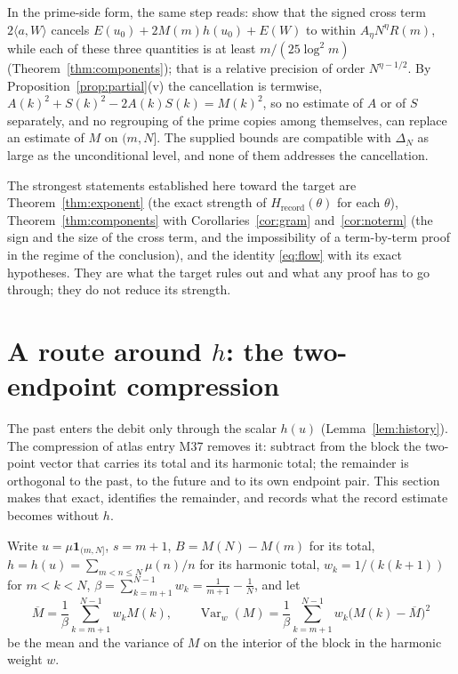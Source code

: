 \documentclass[11pt]{article}
\theoremstyle{definition}
\theoremstyle{remark}
\newcommand{\ip}[2]{\langle #1,#2\rangle}
\newcommand{\Hrec}{H_{\mathrm{record}}}
\begin{document}
In the prime-side form, the same step reads: show that the signed cross term $2\ip aW$ cancels $E(u_0)+2M(m)h(u_0)+E(W)$ to within $A_\eta N^\eta R(m)$, while each of these three quantities is at least $m/(25\log^2m)$ (Theorem~\ref{thm:components}); that is a relative precision of order $N^{\eta-1/2}$. By Proposition~\ref{prop:partial}(v) the cancellation is termwise, $A(k)^2+S(k)^2-2A(k)S(k)=M(k)^2$, so no estimate of $A$ or of $S$ separately, and no regrouping of the prime copies among themselves, can replace an estimate of $M$ on $(m,N]$. The supplied bounds are compatible with $\Delta_N$ as large as the unconditional level, and none of them addresses the cancellation.

The strongest statements established here toward the target are Theorem~\ref{thm:exponent} (the exact strength of $\Hrec(\theta)$ for each $\theta$), Theorem~\ref{thm:components} with Corollaries~\ref{cor:gram} and~\ref{cor:noterm} (the sign and the size of the cross term, and the impossibility of a term-by-term proof in the regime of the conclusion), and the identity \eqref{eq:flow} with its exact hypotheses. They are what the target rules out and what any proof has to go through; they do not reduce its strength.

\section{A route around $h$: the two-endpoint compression}\label{sec:aroundh}

The past enters the debit only through the scalar $h(u)$ (Lemma~\ref{lem:history}). The compression of atlas entry M37 removes it: subtract from the block the two-point vector that carries its total and its harmonic total; the remainder is orthogonal to the past, to the future and to its own endpoint pair. This section makes that exact, identifies the remainder, and records what the record estimate becomes without $h$.

Write $u=\mu\mathbf 1_{(m,N]}$, $s=m+1$, $B=M(N)-M(m)$ for its total, $h=h(u)=\sum_{m<n\le N}\mu(n)/n$ for its harmonic total, $w_k=1/(k(k+1))$ for $m<k<N$, $\beta=\sum_{k=m+1}^{N-1}w_k=\frac1{m+1}-\frac1N$, and let
\[
\overline M=\frac1\beta\sum_{k=m+1}^{N-1}w_kM(k),\qquad \operatorname{Var}_w(M)=\frac1\beta\sum_{k=m+1}^{N-1}w_k\big(M(k)-\overline M\big)^2
\]
be the mean and the variance of $M$ on the interior of the block in the harmonic weight $w$.
\end{document}
